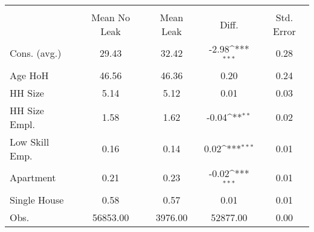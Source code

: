 {
\def\sym#1{\ifmmode^{#1}\else\(^{#1}\)\fi}
\begin{tabular}{l*{1}{cccc}}
\hline\hline
                    &\multicolumn{4}{c}{}                                        \\
                    &Mean No Leak&   Mean Leak&       Diff.         &  Std. Error\\
\hline
Cons. (avg.)        &       29.43&       32.42&       -2.98\sym{***}&        0.28\\
Age HoH             &       46.56&       46.36&        0.20         &        0.24\\
HH Size             &        5.14&        5.12&        0.01         &        0.03\\
HH Size Empl.       &        1.58&        1.62&       -0.04\sym{**} &        0.02\\
Low Skill Emp.      &        0.16&        0.14&        0.02\sym{***}&        0.01\\
Apartment           &        0.21&        0.23&       -0.02\sym{***}&        0.01\\
Single House        &        0.58&        0.57&        0.01         &        0.01\\
Obs.                &    56853.00&     3976.00&    52877.00         &        0.00\\
\hline\hline
\end{tabular}
}
